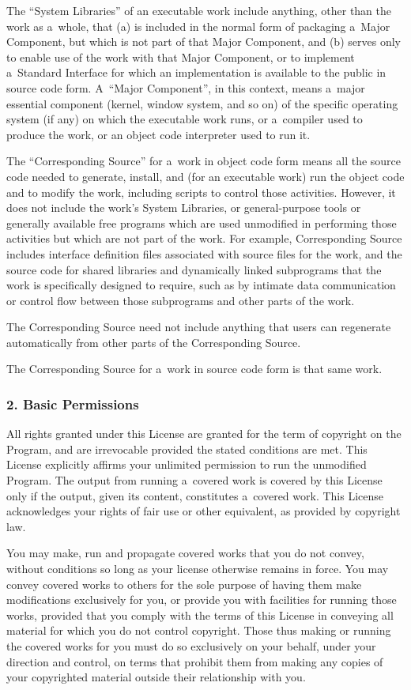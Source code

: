 \documentclass[a4paper, 11pt, twoside]{article}
\begin{document}
The “System Libraries” of an executable work include anything, other than the work as a~whole, that (a) is included in the normal form of packaging a~Major Component, but which is not part of that Major Component, and (b) serves only to enable use of the work with that Major Component, or to implement a~Standard Interface for which an implementation is available to the public in source code form. A~“Major Component”, in this context, means a~major essential component (kernel, window system, and so on) of the specific operating system (if any) on which the executable work runs, or a~compiler used to produce the work, or an object code interpreter used to run it.

The “Corresponding Source” for a~work in object code form means all the source code needed to generate, install, and (for an executable work) run the object code and to modify the work, including scripts to control those activities. However, it does not include the work's System Libraries, or general-purpose tools or generally available free programs which are used unmodified in performing those activities but which are not part of the work. For example, Corresponding Source includes interface definition files associated with source files for the work, and the source code for shared libraries and dynamically linked subprograms that the work is specifically designed to require, such as by intimate data communication or control flow between those subprograms and other parts of the work.

The Corresponding Source need not include anything that users can regenerate automatically from other parts of the Corresponding Source.

The Corresponding Source for a~work in source code form is that same work.

\subsubsection{2. Basic Permissions}

All rights granted under this License are granted for the term of copyright on the Program, and are irrevocable provided the stated conditions are met. This License explicitly affirms your unlimited permission to run the unmodified Program. The output from running a~covered work is covered by this License only if the output, given its content, constitutes a~covered work. This License acknowledges your rights of fair use or other equivalent, as provided by copyright law.

You may make, run and propagate covered works that you do not convey, without conditions so long as your license otherwise remains in force. You may convey covered works to others for the sole purpose of having them make modifications exclusively for you, or provide you with facilities for running those works, provided that you comply with the terms of this License in conveying all material for which you do not control copyright. Those thus making or running the covered works for you must do so exclusively on your behalf, under your direction and control, on terms that prohibit them from making any copies of your copyrighted material outside their relationship with you.
\end{document}
